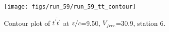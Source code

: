 \begin{figure}[H]
\centering
\texttt{[image: figs/run\_59/run\_59\_tt\_contour]}
\caption{Contour plot of $\overline{t^\prime t^\prime}$ at $z/c$=9.50, $V_{free}$=30.9, station 6.}
\label{fig:run_59_tt_contour}
\end{figure}


